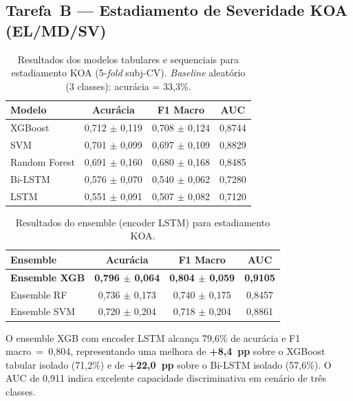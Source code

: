 \documentclass[a4paper,12pt]{article}
\begin{document}
\subsection{Tarefa~B --- Estadiamento de Severidade KOA (EL/MD/SV)}

\begin{table}[H]
  \centering
  \caption{Resultados dos modelos tabulares e sequenciais para estadiamento KOA
           (5-\textit{fold} subj-CV). \textit{Baseline} aleatório (3 classes):
           acurácia = 33,3\%.}
  \label{tab:taskB_base}
  \begin{tabular}{@{}lccc@{}}
    \toprule
    \textbf{Modelo} & \textbf{Acurácia} & \textbf{F1 Macro} & \textbf{AUC} \\
    \midrule
    XGBoost      & 0,712 $\pm$ 0,119 & 0,708 $\pm$ 0,124 & 0,8744 \\
    SVM          & 0,701 $\pm$ 0,099 & 0,697 $\pm$ 0,109 & 0,8829 \\
    Random Forest & 0,691 $\pm$ 0,160 & 0,680 $\pm$ 0,168 & 0,8485 \\
    Bi-LSTM      & 0,576 $\pm$ 0,070 & 0,540 $\pm$ 0,062 & 0,7280 \\
    LSTM         & 0,551 $\pm$ 0,091 & 0,507 $\pm$ 0,082 & 0,7120 \\
    \bottomrule
  \end{tabular}
\end{table}

\begin{table}[H]
  \centering
  \caption{Resultados do ensemble (encoder LSTM) para estadiamento KOA.}
  \label{tab:taskB_ens}
  \begin{tabular}{@{}lccc@{}}
    \toprule
    \textbf{Ensemble} & \textbf{Acurácia} & \textbf{F1 Macro} & \textbf{AUC} \\
    \midrule
    \textbf{Ensemble XGB} &
      \textbf{0,796 $\pm$ 0,064} & \textbf{0,804 $\pm$ 0,059} & \textbf{0,9105} \\
    Ensemble RF  & 0,736 $\pm$ 0,173 & 0,740 $\pm$ 0,175 & 0,8457 \\
    Ensemble SVM & 0,720 $\pm$ 0,204 & 0,718 $\pm$ 0,204 & 0,8861 \\
    \bottomrule
  \end{tabular}
\end{table}

O ensemble XGB com encoder LSTM alcança 79,6\% de acurácia e F1 macro~=~0,804,
representando uma melhora de \textbf{+8,4~pp} sobre o XGBoost tabular isolado
(71,2\%) e de \textbf{+22,0~pp} sobre o Bi-LSTM isolado (57,6\%). O AUC de 0,911
indica excelente capacidade discriminativa em cenário de três classes.
\end{document}
